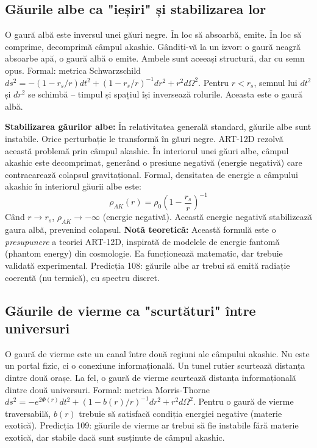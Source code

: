 \documentclass[11pt,a4paper]{article}
\begin{document}
\subsection{Găurile albe ca "ieșiri" și stabilizarea lor}
O gaură albă este inversul unei găuri negre. În loc să absoarbă, emite. În loc să comprime, decomprimă câmpul akashic. Gândiți-vă la un izvor: o gaură neagră absoarbe apă, o gaură albă o emite. Ambele sunt aceeași structură, dar cu semn opus. Formal: metrica Schwarzschild $ds^2 = -(1-r_s/r)dt^2 + (1-r_s/r)^{-1}dr^2 + r^2 d\Omega^2$. Pentru $r < r_s$, semnul lui $dt^2$ și $dr^2$ se schimbă – timpul și spațiul își inversează rolurile. Aceasta este o gaură albă.

\textbf{Stabilizarea găurilor albe:} În relativitatea generală standard, găurile albe sunt instabile. Orice perturbație le transformă în găuri negre. ART-12D rezolvă această problemă prin câmpul akashic. În interiorul unei găuri albe, câmpul akashic este decomprimat, generând o presiune negativă (energie negativă) care contracarează colapsul gravitațional. Formal, densitatea de energie a câmpului akashic în interiorul găurii albe este:
\begin{equation}
\rho_{AK}(r) = \rho_0 \left(1 - \frac{r_s}{r}\right)^{-1}
\end{equation}
Când $r \to r_s$, $\rho_{AK} \to -\infty$ (energie negativă). Această energie negativă stabilizează gaura albă, prevenind colapsul. \textbf{Notă teoretică:} Această formulă este o \textit{presupunere} a teoriei ART-12D, inspirată de modelele de energie fantomă (phantom energy) din cosmologie. Ea funcționează matematic, dar trebuie validată experimental. Predicția 108: găurile albe ar trebui să emită radiație coerentă (nu termică), cu spectru discret.

\subsection{Găurile de vierme ca "scurtături" între universuri}
O gaură de vierme este un canal între două regiuni ale câmpului akashic. Nu este un portal fizic, ci o conexiune informațională. Un tunel rutier scurtează distanța dintre două orașe. La fel, o gaură de vierme scurtează distanța informațională dintre două universuri. Formal: metrica Morris-Thorne $ds^2 = -e^{2\Phi(r)}dt^2 + (1-b(r)/r)^{-1}dr^2 + r^2 d\Omega^2$. Pentru o gaură de vierme traversabilă, $b(r)$ trebuie să satisfacă condiția energiei negative (materie exotică). Predicția 109: găurile de vierme ar trebui să fie instabile fără materie exotică, dar stabile dacă sunt susținute de câmpul akashic.
\end{document}
